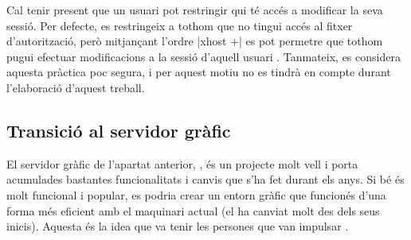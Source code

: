 Cal tenir present que un usuari pot restringir qui té accés a modificar la
seva sessió. Per defecte, es restringeix a tothom que no tingui accés al
fitxer d'autorització, però mitjançant l'ordre \ord|xhost +| es pot permetre
que tothom pugui efectuar modificacions a la sessió d'aquell usuari \cite{Xhost}.
Tanmateix, es considera aquesta pràctica poc segura, i per aquest motiu no es
tindrà en compte durant l'elaboració d'aquest treball.





\subsection{Transició al servidor gràfic }
\label{subsec:wayland}

El servidor gràfic de l'apartat anterior, , és un projecte molt vell
i porta acumulades bastantes funcionalitats i canvis que s'ha fet durant els
anys. Si bé és molt funcional i popular, es podria crear un entorn gràfic que
funcionés d'una forma més eficient amb el maquinari actual (el 
ha canviat molt des dels seus inicis). Aquesta és la idea que va tenir les
persones que van impulsar .

